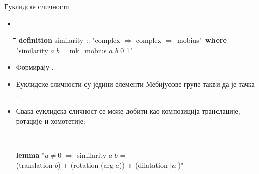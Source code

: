 \documentclass[slidestop, compress, mathserif, containsverbatim, xcolor=dvipsnames]{beamer}
\begin{document}
\begin{frame}{Еуклидске сличности}
  \begin{itemize}
  \item \begin{footnotesize} {\tt
    \begin{tabbing}
      \hspace{5mm}\=\hspace{5mm}\=\hspace{5mm}\=\hspace{5mm}\=\hspace{5mm}\=\kill
      {\bf definition} similarity :: "{}complex $\Rightarrow$ complex $\Rightarrow$ mobius"\ {\bf where} \\
      \>"{}similarity $a$ $b$ = mk\_mobius $a$ $b$ 0 1"
    \end{tabbing}
  } \end{footnotesize}  \vfill
  \item Формирају .  \vfill
  \item Еуклидске сличности су једини елементи Мебијусове групе такви
    да је тачка .  \vfill
  \item Свака еуклидска сличност се може добити као композиција
    транслације, ротације и хомотетије: \begin{footnotesize} {\tt
        \begin{tabbing}
          {\bf lem}\={\bf ma} "{}$a \neq 0$ $\Longrightarrow$ similarity $a$ $b$ = \\
      \>(translation $b$) + (rotation (arg $a$)) + (dilatation $|a|$)"
        \end{tabbing}
    } \end{footnotesize}
  \end{itemize}  \vfill
\end{frame}
\end{document}

